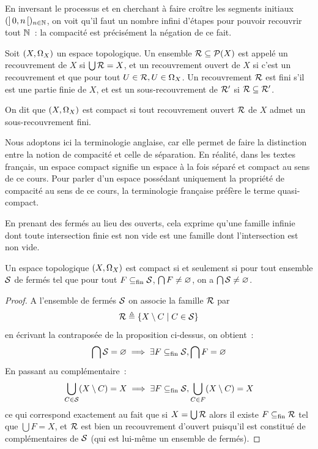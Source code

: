 En inversant le processus et en cherchant à faire croître les segments
initiaux $(\mathord{\left]\,0,n\,\right[})_{n\in\mathbb N}$, on voit qu'il faut un nombre infini
d'étapes pour pouvoir recouvrir tout $\mathbb N$~: la compacité est précisément la
négation de ce fait.

\begin{definition}
  Soit $(X,\Omega_{X})$ un espace topologique. Un ensemble
  $\mathcal R \subseteq \mathcal{P}(X)$ est appelé un recouvrement de $X$ si
  $\bigcup \mathcal R = X$, et un recouvrement ouvert de $X$ si
  c'est un recouvrement et que pour tout
  $U \in \mathcal R, U \in \Omega_{X}$. Un recouvrement
  $\mathcal R$ est fini s'il est une partie finie de $X$, et est un
  sous-recouvrement de $\mathcal R'$ si $\mathcal R \subseteq \mathcal R'$.

  On dit que $(X,\Omega_{X})$ est compact si tout recouvrement ouvert
  $\mathcal R$ de $X$ admet un sous-recouvrement fini.
\end{definition}

\begin{remark}
  Nous adoptons ici la terminologie anglaise, car elle permet de faire la
  distinction entre la notion de compacité et celle de séparation. En réalité,
  dans les textes français, un espace compact signifie un espace à la fois
  séparé et compact au sens de ce cours. Pour parler d'un espace possédant
  uniquement la propriété de compacité au sens de ce cours, la terminologie
  française préfère le terme \og quasi-compact\fg{}.
\end{remark}

En prenant des fermés au lieu des ouverts, cela exprime qu'une famille infinie
dont toute intersection finie est non vide est une famille dont l'intersection
est non vide.

\begin{property}
  Un espace topologique $(X,\Omega_{X})$ est compact si et seulement si pour tout
  ensemble $\mathcal S$ de fermés tel que pour tout $F\subseteq_{\mathrm{fin}} \mathcal S$,
  $\bigcap F \neq\varnothing$, on a $\bigcap \mathcal S \neq\varnothing$.
\end{property}

\begin{proof}
  A l'ensemble de fermés $\mathcal S$ on associe la famille $\mathcal R$ par
  \[\mathcal R \triangleq \left\{ X\setminus C \;\middle\vert\; C \in \mathcal S \right\}\]
  en écrivant la contraposée de la proposition ci-dessus, on obtient~:
  \[\bigcap \mathcal S =\varnothing\implies
  \exists F\subseteq_{\mathrm{fin}} \mathcal S, \bigcap F = \varnothing\]
  En passant au complémentaire~:
  \[\bigcup_{C \in \mathcal S}(X\setminus C) = X\implies
  \exists F\subseteq_{\mathrm{fin}} \mathcal S, \bigcup_{C\in F}(X\setminus C) = X\]
  ce qui correspond exactement au fait que si $X = \bigcup \mathcal R$ alors
  il existe $F\subseteq_{\mathrm{fin}} \mathcal R$ tel que $\bigcup F = X$, et
  $\mathcal R$ est bien un recouvrement d'ouvert puisqu'il est constitué de
  complémentaires de $\mathcal S$ (qui est lui-même un ensemble de fermés).
\end{proof}

